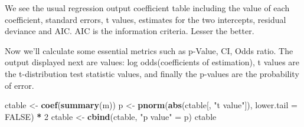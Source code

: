 \documentclass[
]{article}
\newenvironment{Shaded}{\begin{snugshade}}{\end{snugshade}}
\newcommand{\DataTypeTok}[1]{\textcolor[rgb]{0.13,0.29,0.53}{#1}}
\newcommand{\DecValTok}[1]{\textcolor[rgb]{0.00,0.00,0.81}{#1}}
\newcommand{\KeywordTok}[1]{\textcolor[rgb]{0.13,0.29,0.53}{\textbf{#1}}}
\newcommand{\NormalTok}[1]{#1}
\newcommand{\OperatorTok}[1]{\textcolor[rgb]{0.81,0.36,0.00}{\textbf{#1}}}
\newcommand{\OtherTok}[1]{\textcolor[rgb]{0.56,0.35,0.01}{#1}}
\newcommand{\StringTok}[1]{\textcolor[rgb]{0.31,0.60,0.02}{#1}}
\begin{document}
We see the usual regression output coefficient table including the value
of each coefficient, standard errors, t values, estimates for the two
intercepts, residual deviance and AIC. AIC is the information criteria.
Lesser the better.

Now we'll calculate some essential metrics such as p-Value, CI, Odds
ratio. The output displayed next are values: log odds(coefficients of
estimation), t values are the t-distribution test statistic values, and
finally the p-values are the probability of error.

\begin{Shaded}
\begin{Highlighting}[]
\NormalTok{ctable <-}\StringTok{ }\KeywordTok{coef}\NormalTok{(}\KeywordTok{summary}\NormalTok{(m))}
\NormalTok{p <-}\StringTok{ }\KeywordTok{pnorm}\NormalTok{(}\KeywordTok{abs}\NormalTok{(ctable[, }\StringTok{"t value"}\NormalTok{]), }\DataTypeTok{lower.tail =} \OtherTok{FALSE}\NormalTok{) }\OperatorTok{*}\StringTok{ }\DecValTok{2}
\NormalTok{ctable <-}\StringTok{ }\KeywordTok{cbind}\NormalTok{(ctable, }\StringTok{"p value"}\NormalTok{ =}\StringTok{ }\NormalTok{p)}
\NormalTok{ctable}
\end{Highlighting}
\end{Shaded}
\end{document}
